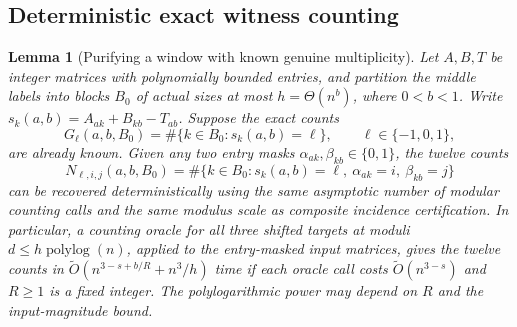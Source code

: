 \documentclass[11pt]{article}
\newtheorem{lemma}[theorem]{Lemma}
\newcommand{\softO}{\widetilde O}
\begin{document}
\subsection*{Deterministic exact witness counting}
\begin{lemma}[Purifying a window with known genuine multiplicity]
\label{lem:known-window-purification}
Let $A,B,T$ be integer matrices with polynomially bounded entries, and
partition the middle labels into blocks $B_0$ of actual sizes at most
$h=\Theta(n^b)$, where $0<b<1$.  Write
$s_k(a,b)=A_{ak}+B_{kb}-T_{ab}$.  Suppose the exact counts
\[
 G_\ell(a,b,B_0)=\#\{k\in B_0:s_k(a,b)=\ell\},
 \qquad \ell\in\{-1,0,1\},
\]
are already known.  Given any two entry masks
$\alpha_{ak},\beta_{kb}\in\{0,1\}$, the twelve counts
\[
 N_{\ell,i,j}(a,b,B_0)=
 \#\{k\in B_0:s_k(a,b)=\ell,\ \alpha_{ak}=i,\ \beta_{kb}=j\}
\]
can be recovered deterministically using the same asymptotic number of
modular counting calls and the same modulus scale as composite incidence
certification.  In particular, a counting oracle for all three shifted
targets at moduli $d\le h\operatorname{polylog}(n)$, applied to the
entry-masked input matrices, gives the twelve
counts in $\softO(n^{3-s+b/R}+n^3/h)$ time if each oracle call costs
$\softO(n^{3-s})$ and $R\ge1$ is a fixed integer.  The polylogarithmic
power may depend on $R$ and the input-magnitude bound.
\end{lemma}
\end{document}
